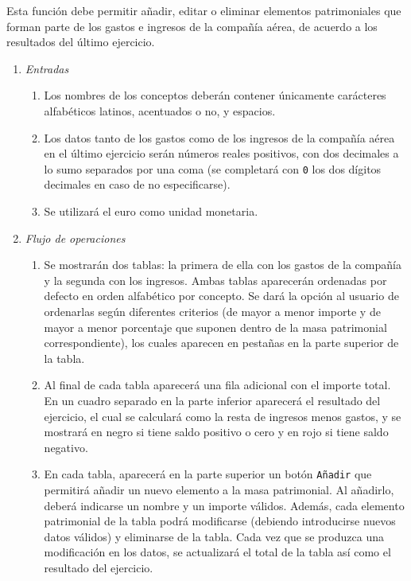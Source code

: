  \label{fun:editareconomica}
	Esta función debe permitir añadir, editar o eliminar elementos patrimoniales que forman parte de los gastos e ingresos de la compañía aérea, de acuerdo a los resultados del último ejercicio.

\begin{enumerate}
	\item \textit{Entradas}
	\begin{enumerate}
		\item Los nombres de los conceptos deberán contener únicamente carácteres alfabéticos latinos, acentuados o no, y espacios.
		\item Los datos tanto de los gastos como de los ingresos de la compañía aérea en el último ejercicio serán números reales positivos, con dos decimales a lo sumo separados por una coma (se completará con \verb|0| los dos dígitos decimales en caso de no especificarse).
		\item Se utilizará el euro como unidad monetaria.
	\end{enumerate}
	\item \textit{Flujo de operaciones}
	\begin{enumerate}
		\item Se mostrarán dos tablas: la primera de ella con los gastos de la compañía y la segunda con los ingresos. Ambas tablas aparecerán ordenadas por defecto en orden alfabético por concepto. Se dará la opción al usuario de ordenarlas según diferentes criterios (de mayor a menor importe y de mayor a menor porcentaje que suponen dentro de la masa patrimonial correspondiente), los cuales aparecen en pestañas en la parte superior de la tabla.
		\item Al final de cada tabla aparecerá una fila adicional con el importe total. En un cuadro separado en la parte inferior aparecerá el resultado del ejercicio, el cual se calculará como la resta de ingresos menos gastos, y se mostrará en negro si tiene saldo positivo o cero y en rojo si tiene saldo negativo.
		\item En cada tabla, aparecerá en la parte superior un botón \verb|Añadir| que permitirá añadir un nuevo elemento a la masa patrimonial. Al añadirlo, deberá indicarse un nombre y un importe válidos. Además, cada elemento patrimonial de la tabla podrá modificarse (debiendo introducirse nuevos datos válidos) y eliminarse de la tabla. Cada vez que se produzca una modificación en los datos, se actualizará el total de la tabla así como el resultado del ejercicio.
	\end{enumerate}

\end{enumerate}

